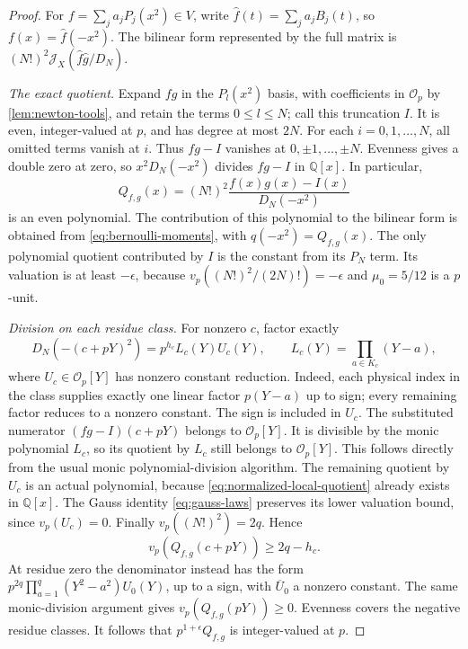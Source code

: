 \documentclass[11pt,letterpaper]{article}
\theoremstyle{definition}
\newcommand{\Q}{\mathbb Q}
\newcommand{\J}{\mathcal J}
\begin{document}
\begin{proof}
For $f=\sum_j a_jP_j(x^2)\in V$, write
$\widehat f(t)=\sum_j a_jB_j(t)$, so $f(x)=\widehat f(-x^2)$.
The bilinear form represented by the full matrix is
$(N!)^2\J_X(\widehat f\widehat g/D_N)$.

\emph{The exact quotient.}
Expand $fg$ in the $P_l(x^2)$ basis, with coefficients in
$\mathcal O_p$ by \cref{lem:newton-tools}, and retain the terms
$0\le l\le N$; call this truncation $I$. It is even,
integer-valued at $p$, and has degree at most $2N$.
For each $i=0,1,\ldots,N$, all omitted terms vanish at $i$.
Thus $fg-I$ vanishes at $0,\pm1,\ldots,\pm N$.
Evenness gives a double zero at zero, so $x^2D_N(-x^2)$ divides
$fg-I$ in $\Q[x]$. In particular,
\begin{equation}\label{eq:normalized-local-quotient}
 Q_{f,g}(x)=(N!)^2\frac{f(x)g(x)-I(x)}{D_N(-x^2)}
\end{equation}
is an even polynomial. The contribution of this polynomial to the
bilinear form is obtained from \eqref{eq:bernoulli-moments}, with
$q(-x^2)=Q_{f,g}(x)$. The only polynomial quotient contributed by
$I$ is the constant from its $P_N$ term. Its valuation is at least
$-\epsilon$, because
$v_p((N!)^2/(2N)!)=-\epsilon$ and $\mu_0=5/12$ is a $p$-unit.

\emph{Division on each residue class.}
For nonzero $c$, factor exactly
\begin{equation}\label{eq:local-denominator-factorization}
 D_N(-(c+pY)^2)=p^{h_c}L_c(Y)U_c(Y),\qquad
 L_c(Y)=\prod_{a\in K_c}(Y-a),
\end{equation}
where $U_c\in\mathcal O_p[Y]$ has nonzero constant reduction.
Indeed, each physical index in the class supplies exactly one linear
factor $p(Y-a)$ up to sign; every remaining factor reduces to a
nonzero constant. The sign is included in $U_c$.
The substituted numerator $(fg-I)(c+pY)$ belongs to
$\mathcal O_p[Y]$. It is divisible by the monic polynomial $L_c$,
so its quotient by $L_c$ still belongs to $\mathcal O_p[Y]$.
This follows directly from the usual monic polynomial-division
algorithm. The remaining quotient by $U_c$ is an actual polynomial,
because \eqref{eq:normalized-local-quotient} already exists in
$\Q[x]$. The Gauss identity \eqref{eq:gauss-laws} preserves its lower
valuation bound, since $v_p(U_c)=0$. Finally
$v_p((N!)^2)=2q$. Hence
\[
 v_p(Q_{f,g}(c+pY))\ge2q-h_c.
\]
At residue zero the denominator instead has the form
$p^{2q}\prod_{a=1}^q(Y^2-a^2)U_0(Y)$, up to a sign, with
$\overline U_0$ a nonzero constant. The same monic-division argument
gives $v_p(Q_{f,g}(pY))\ge0$. Evenness covers the negative residue
classes. It follows that $p^{1+\epsilon}Q_{f,g}$ is integer-valued
at $p$.


\end{proof}
\end{document}
